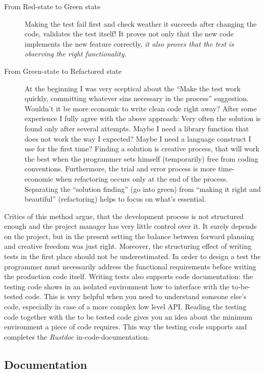 \begin{description}
\item[From Red-state to Green state]
Making the test fail first and check weather it succeeds after changing
the code, validates the test itself! It proves not only that the new
code implements the new feature correctly, \emph{it also proves that the
test is observing the right functionality.}
\item[From Green-state to Refactored state]
At the beginning I was very sceptical about the ``Make the test work
quickly, committing whatever sins necessary in the process'' suggestion.
Wouldn't it be more economic to write clean code right away? After some
experience I fully agree with the above approach: Very often the
solution is found only after several attempts. Maybe I need a library
function that does not work the way I expected? Maybe I need a language
construct I use for the first time? Finding a solution is creative
process, that will work the best when the programmer sets himself
(temporarily) free from coding conventions. Furthermore, the trial and
error process is more time-economic when refactoring occurs only at the
end of the process. Separating the ``solution finding'' (go into green)
from ``making it right and beautiful'' (refactoring) helps to focus on
what's essential.
\end{description}

Critics of this method argue, that the development process is not
structured enough and the project manager has very little control over
it. It surely depends on the project, but in the present setting the
balance between forward planning and creative freedom was just right.
Moreover, the structuring effect of writing tests in the first place
should not be underestimated. In order to design a test the programmer
must necessarily address the functional requirements before writing the
production code itself. Writing tests also supports code documentation:
the testing code shows in an isolated environment how to interface with
the to-be-tested code. This is very helpful when you need to understand
someone else's code, especially in case of a more complex low level API.
Reading the testing code together with the to be tested code gives you
an idea about the minimum environment a piece of code requires. This way
the testing code supports and completes the \emph{Rustdoc}
in-code-documentation.

\subsection{Documentation}\label{_documentation}

